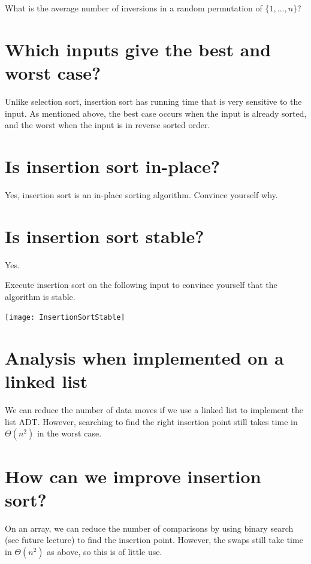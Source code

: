 \begin{Boxample}[6]
What is the average number of inversions in a random permutation of $\{1,\dots, n\}$?
\end{Boxample}

\section{Which inputs give the best and worst case?}
Unlike selection sort, insertion sort has running time that is very sensitive to the input. 
As mentioned above, the best case occurs when the input is already sorted, and the worst when the input is in reverse sorted order.

\section{Is insertion sort in-place?}
Yes, insertion sort is an in-place sorting algorithm. Convince yourself why.

\section{Is insertion sort stable?}
Yes.

\begin{Boxample}[0]
Execute insertion sort on the following input to convince yourself that the algorithm is stable.
\begin{center}
\texttt{[image: InsertionSortStable]} 
\end{center}
\end{Boxample}

\section{Analysis when implemented on a linked list}
We can reduce the number of data moves if we use a linked list to implement 
the list ADT. However, searching to find the right insertion point still takes time in 
$\Theta(n^2)$ in the worst case.

\section{How can we improve insertion sort?}
On an array, we can reduce the number of comparisons by using binary search (see future lecture) to find 
the insertion point. However, the swaps still take time in $\Theta(n^2)$ as above, so this is of little use.

